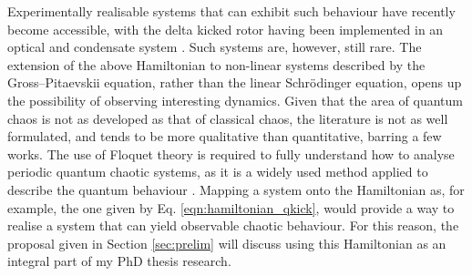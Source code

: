 Experimentally realisable systems that can exhibit such behaviour have recently become accessible, with the delta kicked rotor having been implemented in an optical and condensate system \cite{CT:Ullah_epjd_2012,CT:Lemos_natcomm_2012}. Such systems are, however, still rare. The extension of the above Hamiltonian to non-linear systems described by the Gross--Pitaevskii equation, rather than the linear Schr\"{o}dinger equation, opens up the possibility of observing interesting dynamics. Given that the area of quantum chaos is not as developed as that of classical chaos, the literature is not as well formulated, and tends to be more qualitative than quantitative, barring a few works. The use of Floquet theory is required to fully understand how to analyse periodic quantum chaotic systems, as it is a widely used method applied to describe the quantum behaviour \cite{CT:McCaw_thesis_2005}. Mapping a system onto the Hamiltonian as, for example, the one given by Eq. \eqref{eqn:hamiltonian_qkick}, would provide a way to realise a system that can yield observable chaotic behaviour. For this reason, the proposal given in Section \ref{sec:prelim} will discuss using this Hamiltonian as an integral part of my PhD thesis research.
